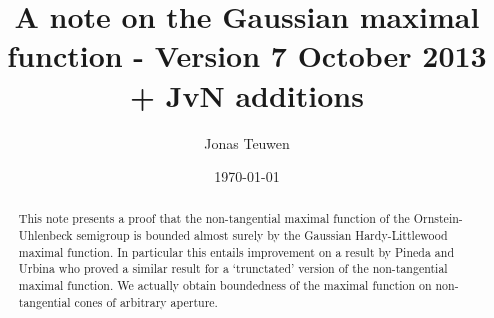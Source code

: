 \documentclass[a4paper,oneside,10pt]{amsproc}
\title[Gaussian maximal functions]{A note on the Gaussian maximal
  function - Version 7 October 2013 + JvN additions}
\author{Jonas Teuwen}%
\date{\today}
\theoremstyle{remark}
\begin{document}
\begin{abstract}
  This note presents a proof that 
  the non-tangential maximal function of the Ornstein-Uhlenbeck semigroup
  is bounded almost surely by the Gaussian Hardy-Littlewood maximal
  function.  In particular this entails improvement on a result by
  Pineda and Urbina \cite{Pineda2008} who proved a similar result for 
  a `trunctated' version of the non-tangential maximal function. 
  We actually obtain boundedness of the maximal function on non-tangential
  cones of arbitrary aperture.
\end{abstract}


\maketitle
\end{document}
